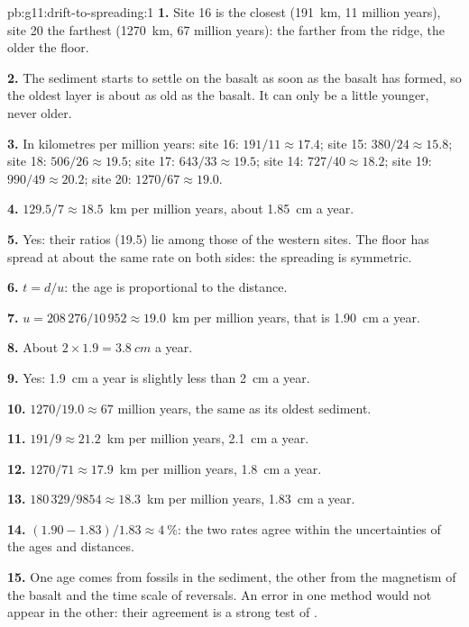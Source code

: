 \begin{solution}{pb:g11:drift-to-spreading:1}
\textbf{1.} Site 16 is the closest (\qty{191}{km}, 11 million years), site 20
the farthest (\qty{1270}{km}, 67 million years): the farther from the ridge,
the older the floor.

\textbf{2.} The sediment starts to settle on the basalt as soon as the basalt
has formed, so the oldest layer is about as old as the basalt. It can only be
a little younger, never older.

\textbf{3.} In kilometres per million years: site 16: $191/11 \approx 17.4$;
site 15: $380/24 \approx 15.8$; site 18: $506/26 \approx 19.5$; site 17:
$643/33 \approx 19.5$; site 14: $727/40 \approx 18.2$; site 19: $990/49
\approx 20.2$; site 20: $1270/67 \approx 19.0$.

\textbf{4.} $129.5/7 \approx \num{18.5}$~km per million years, about
\qty{1.85}{cm} a year.

\textbf{5.} Yes: their ratios (19.5) lie among those of the western sites.
The floor has spread at about the same rate on both sides: the spreading is
symmetric.

\textbf{6.} $t = d/u$: the age is proportional to the distance.

\textbf{7.} $u = 208\,276/10\,952 \approx \num{19.0}$~km per million years,
that is \qty{1.90}{cm} a year.

\textbf{8.} About $2 \times 1.9 = \qty{3.8}{cm}$ a year.

\textbf{9.} Yes: \qty{1.9}{cm} a year is slightly less than \qty{2}{cm} a
year.

\textbf{10.} $1270/19.0 \approx 67$ million years, the same as its oldest
sediment.

\textbf{11.} $191/9 \approx \num{21.2}$~km per million years,
\qty{2.1}{cm} a year.

\textbf{12.} $1270/71 \approx \num{17.9}$~km per million years,
\qty{1.8}{cm} a year.

\textbf{13.} $180\,329/9854 \approx \num{18.3}$~km per million years,
\qty{1.83}{cm} a year.

\textbf{14.} $(1.90 - 1.83)/1.83 \approx \qty{4}{\percent}$: the two rates
agree within the uncertainties of the ages and distances.

\textbf{15.} One age comes from fossils in the sediment, the other from the
magnetism of the basalt and the time scale of reversals. An error in one
method would not appear in the other: their agreement is a strong test of
.


\end{solution}
